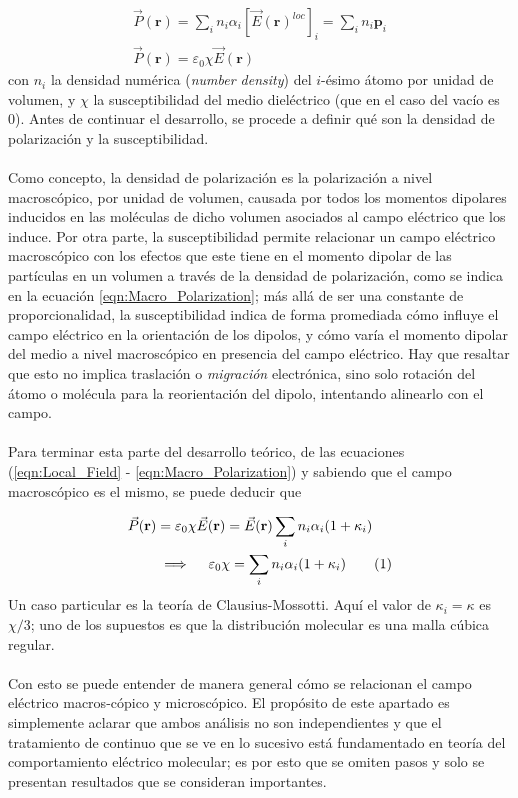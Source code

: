 \documentclass[12pt, twoside, onehalfspace, numbers, spanish]{ezthesis}
\newcommand\numberthis{\addtocounter{equation}{1}\tag{\theequation}}
\numberwithin{equation}{section}
\begin{document}
\begin{gather}
\vec{P}(\mathbf{r}) = \sum_i n_i\alpha_i\left[\vec{E}(\mathbf{r})^{loc}\right]_i = \sum_i n_i\mathbf{p}_i\label{eqn:Micro_Polarization_sumation}\\
\vec{P}(\mathbf{r}) = \varepsilon_0\chi\vec{E}(\mathbf{r})\label{eqn:Macro_Polarization}
\end{gather}
\noindent
con $n_i$ la densidad numérica (\textit{number density}) del $i$-ésimo átomo por unidad de volumen, y $\chi$ la susceptibilidad del medio dieléctrico (que en el caso del vacío es 0). Antes de continuar el desarrollo, se procede a definir qué son la densidad de polarización y la susceptibilidad.\\\\
Como concepto, la densidad de polarización es la polarización a nivel macroscópico, por unidad de volumen, causada por todos los momentos dipolares inducidos en las moléculas de dicho volumen asociados al campo eléctrico que los induce. Por otra parte, la susceptibilidad permite relacionar un campo eléctrico macroscópico con los efectos que este tiene en el momento dipolar de las partículas en un volumen a través de la densidad de polarización, como se indica en la ecuación \ref{eqn:Macro_Polarization}; más allá de ser una constante de proporcionalidad, la susceptibilidad indica de forma promediada cómo influye el campo eléctrico en la orientación de los dipolos, y cómo varía el momento dipolar del medio a nivel macroscópico en presencia del campo eléctrico. Hay que resaltar que esto no implica traslación o \textit{migración} electrónica, sino solo rotación del átomo o molécula para la reorientación del dipolo, intentando alinearlo con el campo.\\\\
Para terminar esta parte del desarrollo teórico, de las ecuaciones (\ref{eqn:Local_Field} - \ref{eqn:Macro_Polarization}) y sabiendo que el campo macroscópico es el mismo, se puede deducir que

\begin{align*}
\vec{P}(\mathbf{r}) &= \varepsilon_0\chi\vec{E}(\mathbf{r}) = \vec{E}(\mathbf{r})\sum_in_i\alpha_i(1+\kappa_i)\\
&\implies\quad \varepsilon_0\chi = \sum_in_i\alpha_i(1+\kappa_i) \numberthis
\end{align*}
\noindent
Un caso particular es la teoría de Clausius-Mossotti. Aquí el valor de $\kappa_i = \kappa$ es $\chi/3$; uno de los supuestos es que la distribución molecular es una malla cúbica regular.\\\\
Con esto se puede entender de manera general cómo se relacionan el campo eléctrico macros-cópico y microscópico. El propósito de este apartado es simplemente aclarar que ambos análisis no son independientes y que el tratamiento de continuo que se ve en lo sucesivo está fundamentado en teoría del comportamiento eléctrico molecular; es por esto que se omiten pasos y solo se presentan resultados que se consideran importantes.
\end{document}
